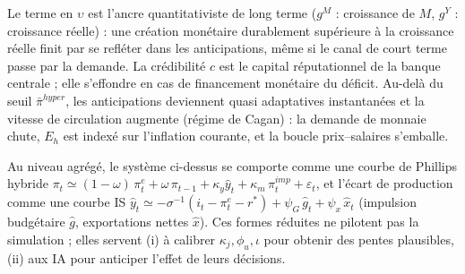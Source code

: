 \documentclass[11pt,a4paper]{article}
\begin{document}
Le terme en $\upsilon$ est l'ancre quantitativiste de long terme ($g^M$ : croissance de $M$, $g^Y$ : croissance réelle) : une création monétaire durablement supérieure à la croissance réelle finit par se refléter dans les anticipations, même si le canal de court terme passe par la demande. La crédibilité $c$ est le capital réputationnel de la banque centrale ; elle s'effondre en cas de financement monétaire du déficit. Au-delà du seuil $\bar\pi^{hyper}$, les anticipations deviennent quasi adaptatives instantanées et la vitesse de circulation augmente (régime de Cagan) : la demande de monnaie chute, $E_h$ est indexé sur l'inflation courante, et la boucle prix--salaires s'emballe.

\begin{lit}
Au niveau agrégé, le système ci-dessus se comporte comme une courbe de Phillips hybride
$\pi_t \simeq (1-\omega)\,\pi^e_t + \omega\,\pi_{t-1} + \kappa_y \hat y_t + \kappa_m\, \pi^{imp}_t + \varepsilon_t$,
et l'écart de production comme une courbe IS
$\hat y_t \simeq -\sigma^{-1}(i_t - \pi^e_t - r^\ast) + \psi_G\,\hat g_t + \psi_x\,\hat x_t$
(impulsion budgétaire $\hat g$, exportations nettes $\hat x$). Ces formes réduites ne pilotent pas la simulation ; elles servent (i) à calibrer $\kappa_j,\phi_u,\iota$ pour obtenir des pentes plausibles, (ii) aux IA pour anticiper l'effet de leurs décisions.
\end{lit}
\end{document}
